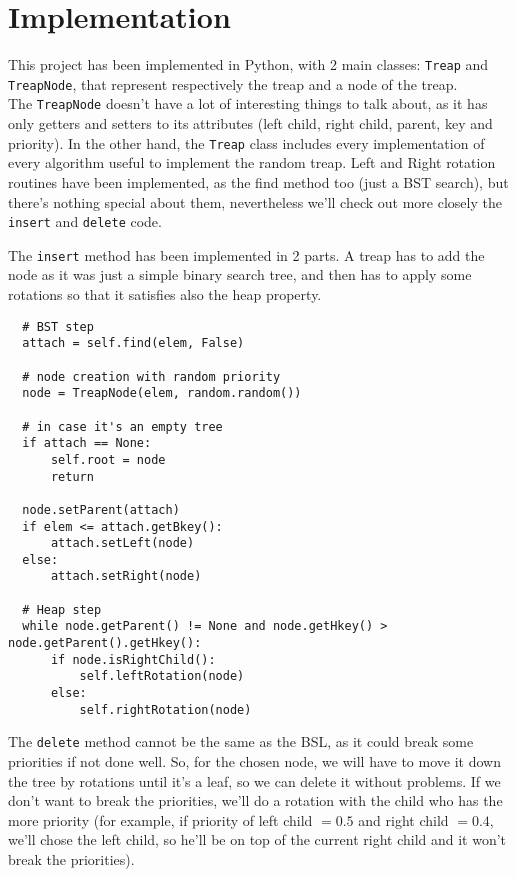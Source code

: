 \documentclass[a4paper,10pt]{article}
\begin{document}
\section{Implementation}

This project has been implemented in Python, with 2 main classes: \verb|Treap| and \verb|TreapNode|, that represent respectively the treap and a node of the treap. \\

The \verb|TreapNode| doesn't have a lot of interesting things to talk about, as it has only getters and setters to its attributes (left child, right child, parent, key and priority).
In the other hand, the \verb|Treap| class includes every implementation of every algorithm
useful to implement the random treap. Left and Right rotation routines have been implemented, as the find method too (just a BST search), but there's nothing special about them, nevertheless we'll check out more closely the \verb|insert| and \verb|delete| code.

The \verb|insert| method has been implemented in 2 parts. A treap has to add the node as it was just
a simple binary search tree, and then has to apply some rotations so that it satisfies also the heap
property.

\begin{lstlisting}
  # BST step
  attach = self.find(elem, False)

  # node creation with random priority
  node = TreapNode(elem, random.random())

  # in case it's an empty tree
  if attach == None:
      self.root = node
      return

  node.setParent(attach)
  if elem <= attach.getBkey():
      attach.setLeft(node)
  else:
      attach.setRight(node)

  # Heap step
  while node.getParent() != None and node.getHkey() > node.getParent().getHkey():
      if node.isRightChild():
          self.leftRotation(node)
      else:
          self.rightRotation(node)
\end{lstlisting}

The \verb|delete| method cannot be the same as the BSL, as it could break some priorities
if not done well. So, for the chosen node, we will have to move it down the tree by rotations until
it's a leaf, so we can delete it without problems. If we don't want to break the priorities, we'll do a
rotation with the child who has the more priority (for example, if priority of left child $= 0.5$ and right child $=0.4$, we'll chose the left child, so he'll be on top of the current right child and it won't break the priorities).
\end{document}
